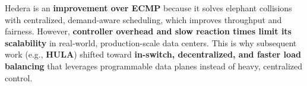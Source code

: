 Hedera is an \textbf{improvement over ECMP} because it solves elephant collisions with centralized, demand-aware scheduling, which improves throughput and fairness. However, \textbf{controller overhead and slow reaction times limit its scalability} in real-world, production-scale data centers. This is why subsequent work (e.g., \textbf{HULA}) shifted toward \textbf{in-switch, decentralized, and faster load balancing} that leverages programmable data planes instead of heavy, centralized control.